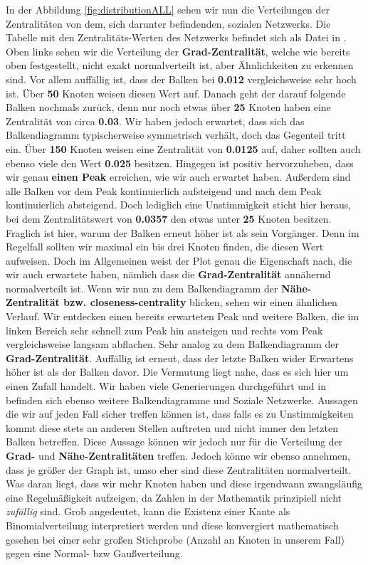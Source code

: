 In der Abbildung \ref{fig:distributionALL} sehen wir nun die Verteilungen der Zentralitäten von dem, sich darunter befindenden, sozialen Netzwerks. Die Tabelle mit den Zentralitäts-Werten des Netzwerks befindet sich als Datei in \cite{TZ}. Oben links sehen wir die Verteilung der \textbf{Grad-Zentralität}, welche wie bereits oben festgestellt, nicht exakt normalverteilt ist, aber Ähnlichkeiten zu erkennen sind. Vor allem auffällig ist, dass der Balken bei \textbf{0.012} vergleichsweise sehr hoch ist. Über \textbf{50} Knoten weisen diesen Wert auf. Danach geht der darauf folgende Balken nochmals zurück, denn nur noch etwas über \textbf{25} Knoten haben eine Zentralität von circa \textbf{0.03}. Wir haben jedoch erwartet, dass sich das Balkendiagramm typischerweise symmetrisch verhält, doch das Gegenteil tritt ein. Über \textbf{150} Knoten weisen eine Zentralität von \textbf{0.0125} auf, daher sollten auch ebenso viele den Wert \textbf{0.025} besitzen. Hingegen ist positiv hervorzuheben, dass wir genau \textbf{einen Peak} erreichen, wie wir auch erwartet haben. Außerdem sind alle Balken vor dem Peak kontinuierlich aufsteigend und nach dem Peak kontinuierlich absteigend. Doch lediglich eine Unstimmigkeit sticht hier heraus, bei dem Zentralitätswert von \textbf{0.0357} den etwas unter \textbf{25} Knoten besitzen. Fraglich ist hier, warum der Balken erneut höher ist als sein Vorgänger. Denn im Regelfall sollten wir maximal ein bis drei Knoten finden, die diesen Wert aufweisen. Doch im Allgemeinen weist der Plot genau die Eigenschaft nach, die wir auch erwartete haben, nämlich dass die \textbf{Grad-Zentralität} annähernd normalverteilt ist. Wenn wir nun zu dem Balkendiagramm der \textbf{Nähe-Zentralität bzw. closeness-centrality} blicken, sehen wir einen ähnlichen Verlauf. Wir entdecken einen bereits erwarteten Peak und weitere Balken, die im linken Bereich sehr schnell zum Peak hin ansteigen und rechts vom Peak vergleichsweise langsam abflachen. Sehr analog zu dem Balkendiagramm der \textbf{Grad-Zentralität}. Auffällig ist erneut, dass der letzte Balken wider Erwartens höher ist als der Balken davor. Die Vermutung liegt nahe, dass es sich hier um einen Zufall handelt. Wir haben viele Generierungen durchgeführt und in \cite{TZ} befinden sich ebenso weitere Balkendiagramme und Soziale Netzwerke. Aussagen die wir auf jeden Fall sicher treffen können ist, dass falls es zu Unstimmigkeiten kommt diese stets an anderen Stellen auftreten und nicht immer den letzten Balken betreffen. Diese Aussage können wir jedoch nur für die Verteilung der \textbf{Grad-} und \textbf{Nähe-Zentralitäten} treffen. Jedoch könne wir ebenso annehmen, dass je größer der Graph ist, umso eher sind diese Zentralitäten normalverteilt. Was daran liegt, dass wir mehr Knoten haben und diese irgendwann zwangsläufig eine Regelmäßigkeit aufzeigen, da Zahlen in der Mathematik prinzipiell nicht \textit{zufällig} sind. Grob angedeutet, kann die Existenz einer Kante als Binomialverteilung interpretiert werden und diese konvergiert mathematisch gesehen bei einer sehr großen Stichprobe (Anzahl an Knoten in unserem Fall) gegen eine Normal- bzw Gaußverteilung.
